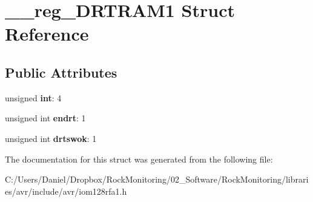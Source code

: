 \hypertarget{struct____reg___d_r_t_r_a_m1}{}\section{\+\_\+\+\_\+reg\+\_\+\+D\+R\+T\+R\+A\+M1 Struct Reference}
\label{struct____reg___d_r_t_r_a_m1}
\subsection*{Public Attributes}
\begin{DoxyCompactItemize}
\item 
unsigned {\bfseries int}\+: 4\hypertarget{struct____reg___d_r_t_r_a_m1_a84edb325d01426188805e509f2a3631e}{}\label{struct____reg___d_r_t_r_a_m1_a84edb325d01426188805e509f2a3631e}

\item 
unsigned int {\bfseries endrt}\+: 1\hypertarget{struct____reg___d_r_t_r_a_m1_ab5c491ab8e48a12341df08b90647e2e0}{}\label{struct____reg___d_r_t_r_a_m1_ab5c491ab8e48a12341df08b90647e2e0}

\item 
unsigned int {\bfseries drtswok}\+: 1\hypertarget{struct____reg___d_r_t_r_a_m1_adaa4f1abcd3854c817e567c5362bd921}{}\label{struct____reg___d_r_t_r_a_m1_adaa4f1abcd3854c817e567c5362bd921}

\end{DoxyCompactItemize}


The documentation for this struct was generated from the following file\+:\begin{DoxyCompactItemize}
\item 
C\+:/\+Users/\+Daniel/\+Dropbox/\+Rock\+Monitoring/02\+\_\+\+Software/\+Rock\+Monitoring/libraries/avr/include/avr/iom128rfa1.\+h\end{DoxyCompactItemize}
